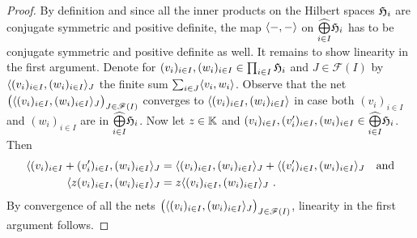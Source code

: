 \begin{proof}
  By definition and since all the inner products on the Hilbert spaces $\mathfrak{H}_i$ are conjugate
  symmetric and positive definite, the map $\langle -,- \rangle $ on
  $\widehat{\bigoplus\limits_{i\in I}} \mathfrak{H}_i$ has to be conjugate symmetric and positive definite
  as well. It remains to show linearity in the first argument.
  Denote for  $(v_i)_{i\in I}, (w_i)_{i\in I} \in \prod_{i\in I} \mathfrak{H}_i$
  and $J\in \mathscr{F} (I)$ by $\langle (v_i)_{i\in I} ,(w_i)_{i\in I} \rangle_J$ the finite sum
  $\sum_{i\in J} \langle v_i,w_i \rangle$. Observe that the net
  $\big( \langle (v_i)_{i\in I} ,(w_i)_{i\in I} \rangle_J \big)_{J\in \mathscr{F}(I)}$ converges to
  $\langle (v_i)_{i\in I} ,(w_i)_{i\in I} \rangle$ in case both $(v_i)_{i\in I}$ and $(w_i)_{i\in I}$
  are in $\widehat{\bigoplus\limits_{i\in I}} \mathfrak{H}_i$. Now let $z\in \mathbb{K}$ and 
  $(v_i)_{i\in I}, (v_i^\prime)_{i\in I},  (w_i)_{i\in I} \in \widehat{\bigoplus\limits_{i\in I}} \mathfrak{H}_i$.
  Then 
  \begin{equation*}
    \begin{split}
      \langle (v_i)_{i\in I} + (v_i^\prime)_{i\in I},(w_i)_{i\in I} \rangle_J & =
      \langle (v_i)_{i\in I} ,(w_i)_{i\in I} \rangle_J + \langle (v_i^\prime)_{i\in I},(w_i)_{i\in I} \rangle_J
      \quad\text{and}\\
      \langle z (v_i)_{i\in I},(w_i)_{i\in I} \rangle_J & = z \langle (v_i)_{i\in I} ,(w_i)_{i\in I} \rangle_J \ .
    \end{split}
  \end{equation*}
  By convergence of all the nets $\big( \langle (v_i)_{i\in I} ,(w_i)_{i\in I} \rangle_J \big)_{J\in \mathscr{F}(I)}$,
  linearity in the first argument follows.


\end{proof}
